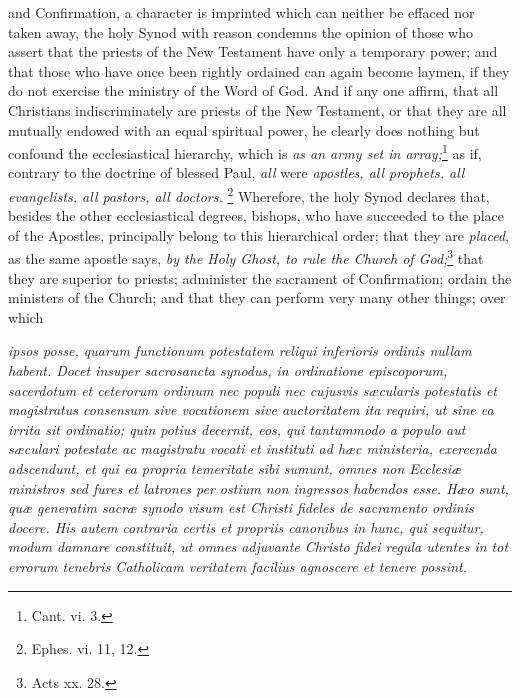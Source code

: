 and Confirmation, a character is imprinted which can neither be effaced nor taken away, the holy Synod with reason condemns the opinion of those who assert that the priests of the New Testament have only a temporary power; and that those who have once been rightly ordained can again become laymen, if they do not exercise the ministry of the Word of God. And if any one affirm, that all Christians indiscriminately are priests of the New Testament, or that they are all mutually endowed with an equal spiritual power, he clearly does nothing but confound the ecclesiastical hierarchy, which is \emph{as an army set in array;}\footnote{\par   Cant. vi. 3.} as if, contrary to the doctrine of blessed Paul, \emph{all} were \emph{apostles, all prophets, all evangelists, all pastors, all doctors.} \footnote{\par   Ephes. vi. 11, 12.} Wherefore, the holy Synod declares that, besides the other ecclesiastical degrees, bishops, who have succeeded to the place of the Apostles, principally belong to this hierarchical order; that they are \emph{placed}, as the same apostle says, \emph{by the Holy Ghost, to rule the Church of God;}\footnote{\par   Acts xx. 28.} that they are superior to priests; administer the sacrament of Confirmation; ordain the ministers of the Church; and that they can perform very many other things; over which

\emph{ipsos posse, quarum functionum potestatem reliqui inferioris ordinis nullam habent. Docet insuper sacrosancta synodus, in ordinatione episcoporum, sacerdotum et ceterorum ordinum nec populi nec cujusvis sæcularis potestatis et magistratus consensum sive vocationem sive auctoritatem ita requiri, ut sine ea irrita sit ordinatio; quin potius decernit, eos, qui tantummodo a populo aut sæculari potestate ac magistratu vocati et instituti ad hæc ministeria, exercenda adscendunt, et qui ea propria temeritate sibi sumunt, omnes non Ecclesiæ ministros sed fures et latrones per ostium non ingressos habendos esse. Hæo sunt, quæ generatim sacræ synodo visum est Christi fideles de sacramento ordinis docere. His autem contraria certis et propriis canonibus in hunc, qui sequitur, modum damnare constituit, ut omnes adjuvante Christo fidei regula utentes in tot errorum tenebris Catholicam veritatem facilius agnoscere et tenere possint.}

